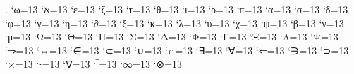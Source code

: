 \renewcommand*{\C}{\mathbb{C}}
\newcommand{\Q}{\mathbb{Q}}
\newcommand{\K}{\mathbb{K}}
\newcommand{\N}{\mathbb{N}}
\newcommand{\Z}{\mathbb{Z}}
\renewcommand{\AA}{\mathbb{A}}
\newcommand{\DD}{\mathbb{D}}
\newcommand{\MM}{\mathbb{M}}
\renewcommand{\a}{~\textnormal{\iflanguage{german}{auf}{on} }}
\renewcommand{\i}{~\textnormal{in }}
\newcommand{\ex}{~\textnormal{\iflanguage{german}{existiert}{exists} }}
\newcommand{\fa}{\quad\textnormal{\iflanguage{german}{für alle}{for all} }}
\newcommand{\st}{\quad\textnormal{s.t. }}
\newcommand{\f}{\quad\textnormal{\iflanguage{german}{für}{for} }}
\newcommand{\so}{\quad\textnormal{\iflanguage{german}{sonst}{else} }}
\newcommand{\fü}{\quad\textnormal{\iflanguage{german}{f.ü.}{a.e.} }}
\newcommand{\m}{~\textnormal{\iflanguage{german}{mit}{with} }}
\newcommand{\E}{\mathbbm{1}}
\renewcommand{\Re}{\operatorname{Re}}
\renewcommand{\Im}{\operatorname{Im}}
\renewcommand{\O}{\mathcal{O}}
\newcommand{\RR}{\mathcal{R}}
\newcommand{\A}{\mathcal{A}}
\newcommand{\M}{\mathcal{M}}
\newcommand{\W}{\mathcal{W}}
\newcommand{\Schwarz}{\mathcal{S}}
\newcommand{\bepsilon}{\varepsilon}
\newcommand{\bphi}{\varphi}
\renewcommand{\epsilon}{\varepsilon}
\renewcommand{\arraystretch}{2.3}
\newcommand{\mydots}[1]{\IfBeginWith{#1}{,}{\ldots#1}{\cdots#1}}
\newcommand{\lt}{\left}
\newcommand{\rt}{\right}
\newcommand{\mt}{\middle}
\arraycolsep=2pt
\makeatletter
{}
 {\let\@ifnextchar\new@ifnextchar
  \left\lbrace
  \def\arraystretch{#2}%
  }
 {\endarray\right.}
\makeatother
\newcommand{\mat}[2][6pt]{\arraycolsep=#1\begin{pmatrix}#2\end{pmatrix}}
\newcommand{\smat}[1]{\left(\begin{smallmatrix}#1\end{smallmatrix}\right)}
\catcode`ω=13
\catcode`ℵ=13
\catcode`ε=13
\catcode`ζ=13
\catcode`τ=13
\catcode`θ=13
\catcode`ι=13
\catcode`ρ=13
\catcode`π=13
\catcode`α=13
\catcode`σ=13
\catcode`δ=13
\catcode`φ=13
\catcode`γ=13
\catcode`η=13
\catcode`∂=13
\catcode`ξ=13
\catcode`κ=13
\catcode`λ=13
\catcode`υ=13
\catcode`χ=13
\catcode`ψ=13
\catcode`β=13
\catcode`ν=13
\catcode`μ=13
\catcode`Ω=13
\catcode`Θ=13
\catcode`Π=13
\catcode`Σ=13
\catcode`Δ=13
\catcode`Φ=13
\catcode`Γ=13
\catcode`Ξ=13
\catcode`Λ=13
\catcode`Ψ=13
\catcode`⇒=13
\catcode`⇔=13
\catcode`∈=13
\catcode`⊂=13
\catcode`∪=13
\catcode`∩=13
\catcode`∃=13
\catcode`∀=13
\catcode`⇐=13
\catcode`∋=13
\catcode`⊃=13
\catcode`×=13
\catcode`⋅=13
\catcode`∇=13
\catcode`‾=13
\catcode`∞=13
\catcode`⊗=13
